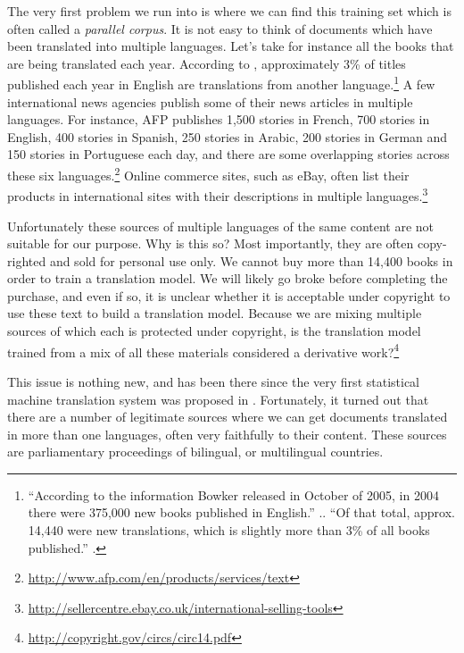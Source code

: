\documentclass{report}
\begin{document}
The very first problem we run into is where we can find this training set which
is often called a {\em parallel corpus}. It is not easy to think of documents
which have been translated into multiple languages. Let's take for instance all
the books that are being translated each year. According to \cite{post2011},
approximately 3\% of titles published each year in English are
translations from another language.\footnote{
    ``According to the information Bowker released in October of 2005, in 2004 there
    were 375,000 new books published in English.'' .. ``Of that total, approx.
    14,440 were new translations, which is slightly more than 3\% of all books
    published.'' \cite{post2011}.
} 
A few international news agencies publish some of their news articles in
multiple languages. For instance, AFP publishes 1,500 stories in French, 700
stories in English, 400 stories in Spanish, 250 stories in Arabic, 200 stories
in German and 150 stories in Portuguese each day, and there are some overlapping
stories across these six languages.\footnote{
    \url{http://www.afp.com/en/products/services/text}
} 
Online commerce sites, such as eBay, often list their products in international
sites with their descriptions in multiple languages.\footnote{
    \url{http://sellercentre.ebay.co.uk/international-selling-tools}
}

Unfortunately these sources of multiple languages of the same content are not
suitable for our purpose. Why is this so? Most importantly, they are often
copy-righted and sold for personal use only. We cannot buy more than 14,400
books in order to train a translation model. We will likely go broke before
completing the purchase, and even if so, it is unclear whether it is acceptable
under copyright to use these text to build a translation model. Because we are
mixing multiple sources of which each is protected under copyright, is the
translation model trained from a mix of all these materials considered a
derivative work?\footnote{
    \url{http://copyright.gov/circs/circ14.pdf}
}

This issue is nothing new, and has been there since the very first statistical
machine translation system was proposed in \cite{brown1990statistical}.
Fortunately, it turned out that there are a number of legitimate sources where
we can get documents translated in more than one languages, often very
faithfully to their content. These sources are parliamentary proceedings of
bilingual, or multilingual countries.
\end{document}
